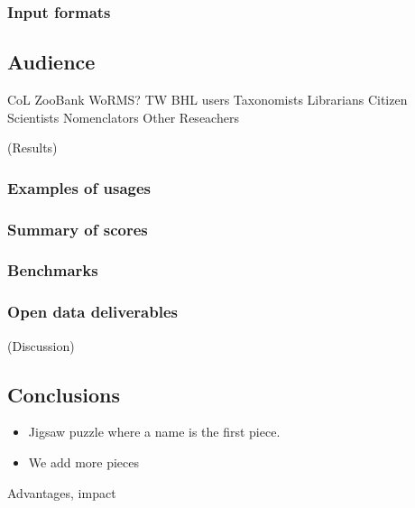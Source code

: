 \documentclass[
]{article}
\providecommand{\tightlist}{%
  \setlength{\itemsep}{0pt}\setlength{\parskip}{0pt}}
\begin{document}
\hypertarget{input-formats}{%
\subsubsection{Input formats}\label{input-formats}}

\hypertarget{audience}{%
\subsection{Audience}\label{audience}}

CoL ZooBank WoRMS? TW BHL users Taxonomists Librarians Citizen
Scientists Nomenclators Other Reseachers

(Results)

\hypertarget{examples-of-usages}{%
\subsubsection{Examples of usages}\label{examples-of-usages}}

\hypertarget{summary-of-scores}{%
\subsubsection{Summary of scores}\label{summary-of-scores}}

\hypertarget{benchmarks}{%
\subsubsection{Benchmarks}\label{benchmarks}}

\hypertarget{open-data-deliverables}{%
\subsubsection{Open data deliverables}\label{open-data-deliverables}}

(Discussion)

\hypertarget{conclusions}{%
\subsection{Conclusions}\label{conclusions}}

\begin{itemize}
\tightlist
\item
  Jigsaw puzzle where a name is the first piece.
\item
  We add more pieces
\end{itemize}

Advantages, impact
\end{document}
